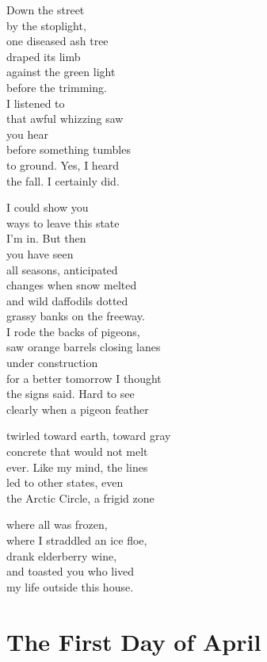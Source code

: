 \documentclass[twoside,10pt]{book}
\begin{document}
Down the street\\
by the stoplight,\\
one diseased ash tree\\
draped its limb\\
against the green light\\
before the trimming.\\
I listened to\\
that awful whizzing saw\\
you hear\\
before something tumbles\\
to ground. Yes, I heard\\
the fall. I certainly did.

I could show you\\
ways to leave this state\\
I'm in. But then\\
you have seen\\
all seasons, anticipated\\
changes when snow melted\\
and wild daffodils dotted\\
grassy banks on the freeway.\\
I rode the backs of pigeons,\\
saw orange barrels closing lanes\\
under construction\\
for a better tomorrow I thought\\
the signs said. Hard to see\\
clearly when a pigeon feather

twirled toward earth, toward gray\\
concrete that would not melt\\
ever. Like my mind, the lines\\
led to other states, even\\
the Arctic Circle, a frigid zone

where all was frozen,\\
where I straddled an ice floe,\\
drank elderberry wine,\\
and toasted you who lived\\
my life outside this house.


\clearpage
\section{The First Day of April}
\end{document}
